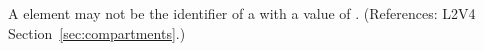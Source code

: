 A  element may not be the identifier of a
\Compartment with a  value
of .
(References: L2V4 Section~\ref{sec:compartments}.)
